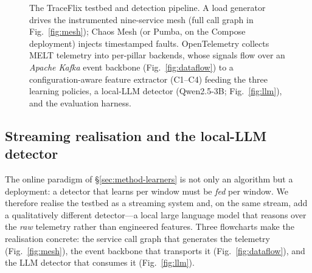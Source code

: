 \documentclass[pdflatex,sn-mathphys-num]{sn-jnl}%
\theoremstyle{thmstyleone}%
\theoremstyle{thmstyletwo}%
\theoremstyle{thmstylethree}%
\begin{document}
\begin{figure}[t]
{}
\caption{The TraceFlix testbed and detection pipeline. A load generator drives the
instrumented nine-service mesh (full call graph in Fig.~\ref{fig:mesh}); Chaos Mesh
(or Pumba, on the Compose deployment) injects timestamped faults. OpenTelemetry
collects MELT telemetry into per-pillar backends, whose signals flow over an
\emph{Apache Kafka} event backbone (Fig.~\ref{fig:dataflow}) to a configuration-aware
feature extractor (C1--C4) feeding the three learning policies, a local-LLM detector
(Qwen2.5-3B; Fig.~\ref{fig:llm}), and the evaluation harness.}\label{fig:arch}
\end{figure}

\subsection{Streaming realisation and the local-LLM detector}\label{sec:method-streaming}

The online paradigm of \S\ref{sec:method-learners} is not only an algorithm but a deployment: a detector that learns per window must be \emph{fed} per window. We therefore realise the testbed as a streaming system and, on the same stream, add a qualitatively different detector---a local large language model that reasons over the \emph{raw} telemetry rather than engineered features. Three flowcharts make the realisation concrete: the service call graph that generates the telemetry (Fig.~\ref{fig:mesh}), the event backbone that transports it (Fig.~\ref{fig:dataflow}), and the LLM detector that consumes it (Fig.~\ref{fig:llm}).
\end{document}

